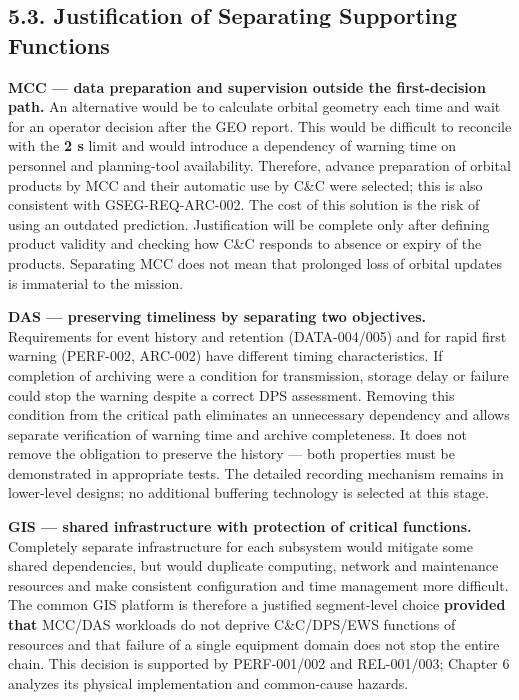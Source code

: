 \subsection{5.3. Justification of Separating Supporting Functions}\label{ddjf-5-3}

\textbf{MCC — data preparation and supervision outside the first-decision path.} An alternative would be to calculate orbital geometry each time and wait for an operator decision after the GEO report. This would be difficult to reconcile with the \textbf{2 s} limit and would introduce a dependency of warning time on personnel and planning-tool availability. Therefore, advance preparation of orbital products by MCC and their automatic use by C\&C were selected; this is also consistent with GSEG-REQ-ARC-002. The cost of this solution is the risk of using an outdated prediction. Justification will be complete only after defining product validity and checking how C\&C responds to absence or expiry of the products. Separating MCC does not mean that prolonged loss of orbital updates is immaterial to the mission.

\textbf{DAS — preserving timeliness by separating two objectives.} Requirements for event history and retention (DATA-004/\allowbreak{}005) and for rapid first warning (PERF-002, ARC-002) have different timing characteristics. If completion of archiving were a condition for transmission, storage delay or failure could stop the warning despite a correct DPS assessment. Removing this condition from the critical path eliminates an unnecessary dependency and allows separate verification of warning time and archive completeness. It does not remove the obligation to preserve the history — both properties must be demonstrated in appropriate tests. The detailed recording mechanism remains in lower-level designs; no additional buffering technology is selected at this stage.

\textbf{GIS — shared infrastructure with protection of critical functions.} Completely separate infrastructure for each subsystem would mitigate some shared dependencies, but would duplicate computing, network and maintenance resources and make consistent configuration and time management more difficult. The common GIS platform is therefore a justified segment-level choice \textbf{provided that} MCC/\allowbreak{}DAS workloads do not deprive C\&C/\allowbreak{}DPS/\allowbreak{}EWS functions of resources and that failure of a single equipment domain does not stop the entire chain. This decision is supported by PERF-001/\allowbreak{}002 and REL-001/\allowbreak{}003; Chapter 6 analyzes its physical implementation and common-cause hazards.

